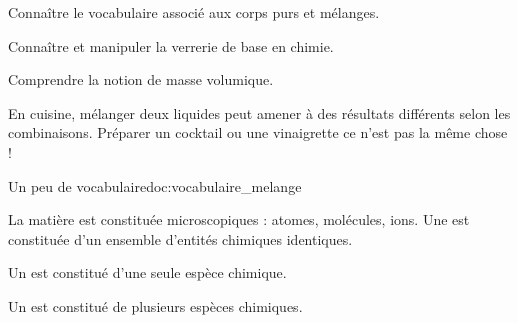 \teteSndCorp

\vspace*{-36pt}


\begin{objectifs}
  \item Connaître le vocabulaire associé aux corps purs et mélanges.
  \item Connaître et manipuler la verrerie de base en chimie.
  \item Comprendre la notion de masse volumique.
\end{objectifs}

\begin{contexte}
  En cuisine, mélanger deux liquides peut amener à des résultats différents selon les combinaisons.
  Préparer un cocktail ou une vinaigrette ce n'est pas la même chose !
  
\end{contexte}


\begin{doc}{Un peu de vocabulaire}{doc:vocabulaire_melange}
  \begin{encart}
    La matière est constituée  microscopiques : atomes, molécules, ions.
    Une  est constituée d’un ensemble d’entités chimiques
identiques.
  \end{encart}
    
  \begin{encart}
    \begin{listePoints}
      \item Un  est constitué d'une seule espèce chimique.
      \item Un  est constitué de plusieurs espèces chimiques.
    \end{listePoints}
  \end{encart}
\end{doc}

